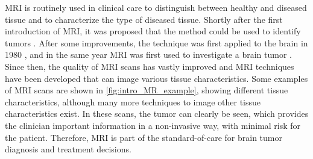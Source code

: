 \gls{MRI} is routinely used in clinical care to distinguish between healthy and diseased tissue and to characterize the type of diseased tissue.
Shortly after the first introduction of \gls{MRI}, it was proposed that the method could be used to identify \glspl{tumor} \autocite{damadian1971tumor}.
After some improvements, the technique was first applied to the brain in 1980 \autocite{holland1980brain}, and in the same year MRI was first used to investigate a brain \gls{tumor} \autocite{hawkes1980NMRbrain}.
Since then, the quality of \gls{MRI} scans has vastly improved and \gls{MRI} techniques have been developed that can image various tissue characteristics.
Some examples of \gls{MRI} scans are shown in \cref{fig:intro_MR_example}, showing different tissue characteristics, although many more techniques to image other tissue characteristics exist.
In these scans, the \gls{tumor} can clearly be seen, which provides the clinician important information in a non-invasive way, with minimal risk for the patient.
Therefore, \gls{MRI} is part of the standard-of-care for brain \gls{tumor} diagnosis and treatment decisions.

